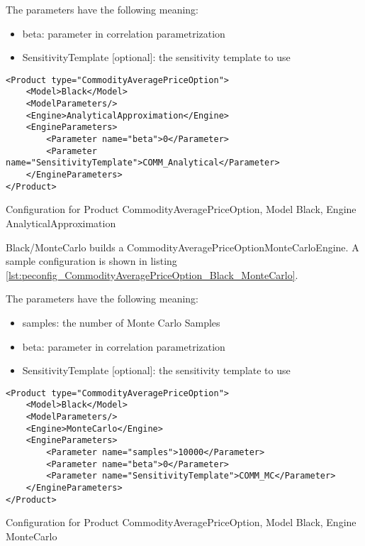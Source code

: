 The parameters have the following meaning:

\begin{itemize}
\item beta: parameter in correlation parametrization
\item SensitivityTemplate [optional]: the sensitivity template to use 
\end{itemize}

\begin{longlisting}
\begin{verbatim}
<Product type="CommodityAveragePriceOption">
    <Model>Black</Model>
    <ModelParameters/>
    <Engine>AnalyticalApproximation</Engine>
    <EngineParameters>
        <Parameter name="beta">0</Parameter>
        <Parameter name="SensitivityTemplate">COMM_Analytical</Parameter>
    </EngineParameters>
</Product>
\end{verbatim}
\caption{Configuration for Product CommodityAveragePriceOption, Model Black, Engine AnalyticalApproximation}
\label{lst:peconfig_CommodityAveragePriceOption_Black_AnalyticalApproximation}
\end{longlisting}

Black/MonteCarlo builds a CommodityAveragePriceOptionMonteCarloEngine. A sample configuration is shown in listing
\ref{lst:peconfig_CommodityAveragePriceOption_Black_MonteCarlo}.

The parameters have the following meaning:

\begin{itemize}
\item samples: the number of Monte Carlo Samples
\item beta: parameter in correlation parametrization
\item SensitivityTemplate [optional]: the sensitivity template to use 
\end{itemize}

\begin{longlisting}
\begin{verbatim}
<Product type="CommodityAveragePriceOption">
    <Model>Black</Model>
    <ModelParameters/>
    <Engine>MonteCarlo</Engine>
    <EngineParameters>
        <Parameter name="samples">10000</Parameter>
        <Parameter name="beta">0</Parameter>
        <Parameter name="SensitivityTemplate">COMM_MC</Parameter>
    </EngineParameters>
</Product>
\end{verbatim}
\caption{Configuration for Product CommodityAveragePriceOption, Model Black, Engine MonteCarlo}
\label{lst:peconfig_CommodityAveragePriceOption_Black_MonteCarlo}
\end{longlisting}

